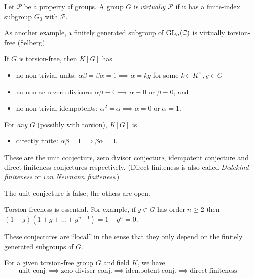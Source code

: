 \begin{definition}
    Let $\mathcal{P}$ be a property of groups.
    A group $G$ is \emph{virtually $\mathcal{P}$} if it has a finite-index subgroup $G_0$ with $\mathcal{P}$.
\end{definition}

As another example, a finitely generated subgroup of $\mathrm{GL}_n(\mathbb{C})$ is virtually torsion-free (Selberg).

\begin{conjecture}
    If $G$ is torsion-free, then $K[G]$ has
    \begin{itemize}
        \item no non-trivial units: $\alpha \beta = \beta \alpha = 1 \implies \alpha = kg$ for some $k \in K^\times, g \in G$
        \item no non-zero zero divisors: $\alpha \beta = 0 \implies \alpha = 0$ or $\beta = 0$, and
        \item no non-trivial idempotents: $\alpha^2 = \alpha \implies \alpha = 0$ or $\alpha = 1$.
    \end{itemize}
    For \emph{any} $G$ (possibly with torsion), $K[G]$ is
    \begin{itemize}
        \item directly finite: $\alpha \beta = 1 \implies \beta \alpha = 1$.
    \end{itemize}
\end{conjecture}

These are the unit conjecture, zero divisor conjecture, idempotent conjecture and direct finiteness conjectures respectively.
(Direct finiteness is also called \emph{Dedekind finiteness} or \emph{von Neumann finiteness}.)

\begin{remark}
    The unit conjecture is false; the others are open.
\end{remark}

\begin{remark}
    Torsion-freeness is essential. For example, if $g \in G$ has order $n \geq 2$ then $(1 - g)(1 + g + \dots + g^{n-1}) = 1 - g^n = 0$.
\end{remark}

\begin{remark}
    These conjectures are ``local'' in the sense that they only depend on the finitely generated subgroups of $G$.
\end{remark}

\begin{proposition}
    \label{proposition:kaplansky_relations}
    For a given torsion-free group $G$ and field $K$, we have \[
        \text{unit conj.} \implies
        \text{zero divisor conj.} \implies
        \text{idempotent conj.} \implies
        \text{direct finiteness}
    \]
\end{proposition}

